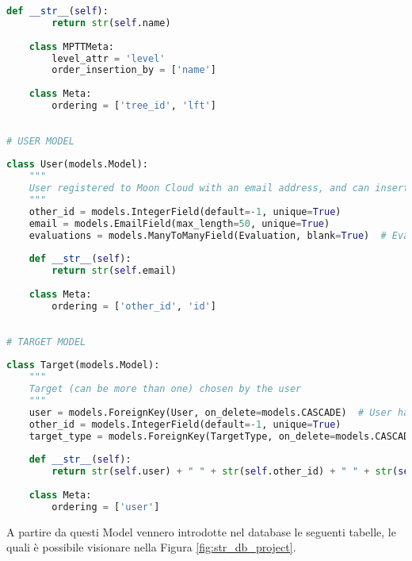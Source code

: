 \begin{lstlisting}[language=Python, label=lst:model, caption={Parti principali del codice che costituiscono i Model della soluzione.}]
    def __str__(self):
        return str(self.name)
 
    class MPTTMeta:
        level_attr = 'level'
        order_insertion_by = ['name']
 
    class Meta:
        ordering = ['tree_id', 'lft']
 
 
# USER MODEL
 
class User(models.Model):
    """
    User registered to Moon Cloud with an email address, and can insert Target and launch Evaluations
    """
    other_id = models.IntegerField(default=-1, unique=True)
    email = models.EmailField(max_length=50, unique=True)
    evaluations = models.ManyToManyField(Evaluation, blank=True)  # Evaluations chosen by user
 
    def __str__(self):
        return str(self.email)
 
    class Meta:
        ordering = ['other_id', 'id']
 
 
# TARGET MODEL
 
class Target(models.Model):
    """
    Target (can be more than one) chosen by the user
    """
    user = models.ForeignKey(User, on_delete=models.CASCADE)  # User has chosen a target_type
    other_id = models.IntegerField(default=-1, unique=True)
    target_type = models.ForeignKey(TargetType, on_delete=models.CASCADE)  # TargetType Id
 
    def __str__(self):
        return str(self.user) + " " + str(self.other_id) + " " + str(self.target_type)
 
    class Meta:
        ordering = ['user']
\end{lstlisting}
%
A partire da questi Model vennero introdotte nel database le seguenti tabelle, le quali è possibile visionare nella Figura 
\ref{fig:str_db_project}.
